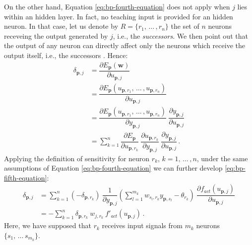 \documentclass[12pt, a4paper, twoside, openright]{report}
\numberwithin{equation}{chapter}
\theoremstyle{theorem}
\theoremstyle{definition}
\theoremstyle{remark}
\theoremstyle{proposition}
\numberwithin{figure}{chapter}
\begin{document}
		On the other hand, Equation \eqref{eq:bp-fourth-equation} does not apply when $j$ lies within an hidden layer. In fact, no teaching input is provided for an hidden neuron. In that case, let us denote by $R = \big\lbrace r_1, \, \ldots \, , r_n \big\rbrace$ the set of $n$ neurons receveing the output generated by $j$, i.e., the \emph{successors}. We then point out that the output of any neuron can directly affect only the neurons which receive the output itself, i.e., the successors \cite{Kri}. Hence: 
		\begin{equation}
			\label{eq:bp-fifth-equation}
			\begin{aligned}
				\delta_{\mathbf{p},j} & = \dfrac{\partial E_{\mathbf{p}}(\mathbf{w})}{\partial u_{\mathbf{p},j}} \\
				& = \dfrac{\partial E_{\mathbf{p}}(u_{\mathbf{p},r_1}, \, \ldots \, , u_{\mathbf{p},r_n})}{\partial u_{\mathbf{p},j}} \\
				& = \dfrac{\partial E_{\mathbf{p}}(u_{\mathbf{p},r_1}, \, \ldots \, , u_{\mathbf{p},r_n})}{\partial y_{\mathbf{p},j}} ~ \dfrac{\partial y_{\mathbf{p},j}}{\partial u_{\mathbf{p},j}} \\
				& = \sum_{k = 1}^{n} \dfrac{\partial E_{\mathbf{p}}}{\partial u_{\mathbf{p},r_k}} ~ \dfrac{\partial u_{\mathbf{p},r_k}}{\partial y_{\mathbf{p},j}} ~ \dfrac{\partial y_{\mathbf{p},j}}{\partial u_{\mathbf{p},j}} \, .
			\end{aligned}
		\end{equation}
		Applying the definition of sensitivity for neuron $r_k$, $k = 1, \, \ldots \, , n$, under the same assumptions of Equation \eqref{eq:bp-fourth-equation} we can further develop \eqref{eq:bp-fifth-equation}:
		\begin{equation}
			\label{eq:bp-sixth-equation}
			\begin{aligned}
			\delta_{\mathbf{p},j} & = \sum_{k = 1}^n \left( - \delta_{\mathbf{p},r_k} \right) ~ \dfrac{1}{\partial y_{\mathbf{p},j}} \left( \sum_{l = 1}^{m_k} w_{s_l,r_k} y_{\mathbf{p},s_l} - \theta_{r_k} \right) ~ \dfrac{\partial f_{act}(u_{\mathbf{p},j})}{\partial u_{\mathbf{p},j}} \\
			& = - \sum_{k = 1}^n \delta_{\mathbf{p},r_k} ~ w_{j,r_k} ~ f'_{act}(u_{\mathbf{p},j}) \, .
			\end{aligned}
		\end{equation}
		Here, we have supposed that $r_k$ receives input signals from $m_k$ neurons $\big\lbrace s_1, \, \ldots \, s_{m_k} \big\rbrace$.
		
\end{document}
